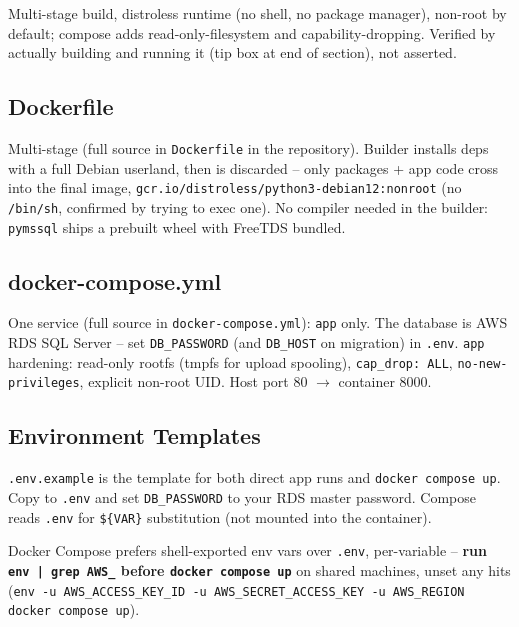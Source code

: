 \documentclass[10pt]{article}
\begin{document}
Multi-stage build, distroless runtime (no shell, no package manager),
non-root by default; compose adds read-only-filesystem and
capability-dropping. Verified by actually building and running it (tip box
at end of section), not asserted.

\subsection{Dockerfile}
\label{sec:dockerfile}

Multi-stage (full source in \texttt{Dockerfile} in the repository). Builder
installs deps with a full Debian userland, then is discarded -- only
packages + app code cross into the final image,
\texttt{gcr.io/distroless/python3-debian12:nonroot} (no \texttt{/bin/sh},
confirmed by trying to exec one). No compiler needed in the builder:
\texttt{pymssql} ships a prebuilt wheel with FreeTDS bundled.

\subsection{docker-compose.yml}

One service (full source in \texttt{docker-compose.yml}): \texttt{app} only.
The database is AWS RDS SQL Server -- set \texttt{DB\_PASSWORD} (and
\texttt{DB\_HOST} on migration) in \texttt{.env}. \texttt{app} hardening: read-only rootfs
(tmpfs for upload spooling), \texttt{cap\_drop: ALL},
\texttt{no-new-privileges}, explicit non-root UID. Host port 80 $\to$
container 8000.

\subsection{Environment Templates}

\texttt{.env.example} is the template for both direct app runs and
\texttt{docker compose up}. Copy to \texttt{.env} and set \texttt{DB\_PASSWORD}
to your RDS master password. Compose reads \texttt{.env} for
\texttt{\$\{VAR\}} substitution (not mounted into the container).

\begin{warnbox}
Docker Compose prefers shell-exported env vars over \texttt{.env}, per-variable
-- \textbf{run \texttt{env | grep AWS\_} before \texttt{docker compose up}}
on shared machines, unset any hits (\texttt{env -u AWS\_ACCESS\_KEY\_ID -u
AWS\_SECRET\_ACCESS\_KEY -u AWS\_REGION docker compose up}).
\end{warnbox}
\end{document}
